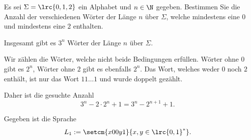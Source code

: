 \begin{questions}
	\question
	\droptotalpoints



	Es sei $\Sigma = \lrc{0,1,2}$ ein Alphabet und $n\in\N$ gegeben. Bestimmen Sie die Anzahl der verschiedenen Wörter der Länge $n$ über $\Sigma$, welche mindestens eine $0$ und mindestens eine $2$ enthalten.
	\begin{solution}
		Insgesamt gibt es $3^n$ Wörter der Länge $n$ über $\Sigma$.

		Wir zählen die Wörter, welche nicht beide Bedingungen erfüllen. Wörter ohne $0$ gibt es $2^n$, Wörter ohne $2$ gibt es ebenfalls $2^n$. Das Wort, welches weder $0$ noch $2$ enthält, ist nur das Wort $11\ldots 1$ und wurde doppelt gezählt.

		Daher ist die gesuchte Anzahl
		\[
			3^n - 2\cdot 2^n + 1
			=
			3^n - 2^{n+1} + 1.
		\]
	\end{solution}
	\droptotalpoints

	\vspace{5cm}

	\clearpage


	Gegeben ist die Sprache
	\[
		L_1 := \setcm{x00y1}{x,y\in\lrc{0,1}^*}.
	\]
	\begin{parts}

\end{parts}
\end{questions}
